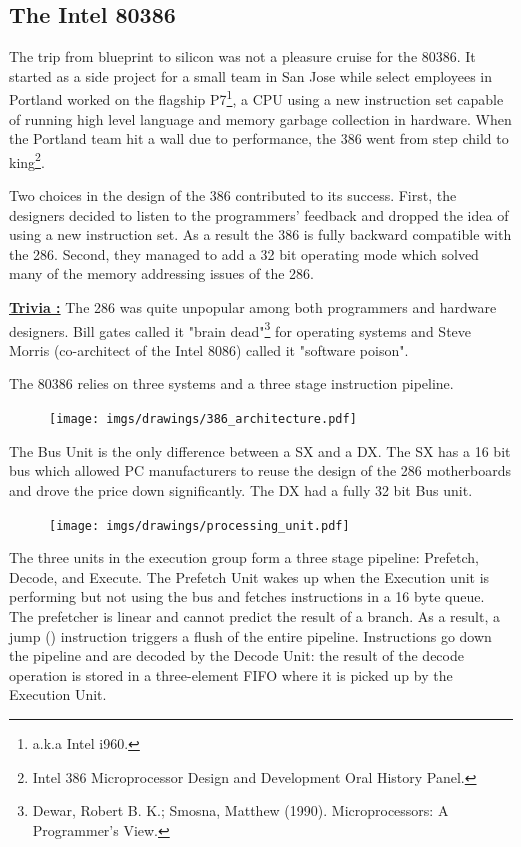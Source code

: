 \documentclass[book.tex]{subfiles}
\begin{document}
\subsection{The Intel 80386}
The trip from blueprint to silicon was not a pleasure cruise for the 80386. It started as a side project for a small team in San Jose while select employees in Portland worked on the flagship P7\footnote{a.k.a Intel i960.}, a CPU using a new instruction set capable of running high level language and memory garbage collection in hardware. When the Portland team hit a wall due to performance, the 386 went from step child to king\footnote{Intel 386 Microprocessor Design and Development Oral History Panel.}.\\
\par
Two choices in the design of the 386 contributed to its success. First, the designers decided to listen to the programmers' feedback and dropped the idea of using a new instruction set. As a result the 386 is fully backward compatible with the 286. Second, they managed to add a 32 bit operating mode which solved many of the memory addressing issues of the 286.\\
\par
\textbf{\underline{Trivia :}}  The 286 was quite unpopular among both programmers and hardware designers. Bill gates called it "brain dead"\footnote{Dewar, Robert B. K.; Smosna, Matthew (1990). Microprocessors: A Programmer's View.} for operating systems and Steve Morris (co-architect of the Intel 8086) called it "software poison".\\
\par
The 80386 relies on three systems and a three stage instruction pipeline.\\
\par
\begin{figure}[H]
\centering
\texttt{[image: imgs/drawings/386\_architecture.pdf]}
\end{figure}
\par
The Bus Unit is the only difference between a SX and a DX. The SX has a 16 bit bus which allowed PC manufacturers to reuse the design of the 286 motherboards and drove the price down significantly. The DX had a fully 32 bit Bus unit.
\par
\begin{figure}[H]
\centering
\texttt{[image: imgs/drawings/processing\_unit.pdf]}
\end{figure}
\par
The three units in the execution group form a three stage pipeline: Prefetch, Decode, and Execute. The Prefetch Unit wakes up when the Execution unit is performing but not using the bus and fetches instructions in a 16 byte queue. The prefetcher is linear and cannot predict the result of a branch. As a result, a jump () instruction triggers a flush of the entire pipeline. Instructions go down the pipeline and are decoded by the Decode Unit: the result of the decode operation is stored in a three-element FIFO where it is picked up by the Execution Unit.\\
\par
\end{document}
